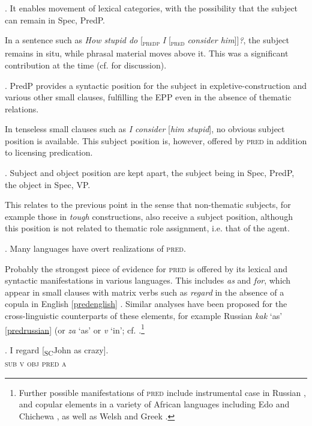 \ex. It enables movement of lexical categories, with the possibility that the subject can remain in Spec, PredP.

In a sentence such as \textit{How stupid do} [\textsubscript{\textsc{predp}} \textit{I} [\textsubscript{\textsc{pred}} \textit{consider him}]]\textit{?}, the subject remains in situ, while phrasal material moves above it. This was a significant contribution at the time (cf. \citealt[68–69]{matushansky:2019:against} for discussion).

\ex. PredP provides a syntactic position for the subject in expletive-construc\-tion and various other small clauses, fulfilling the EPP even in the absence of thematic relations.

In tenseless small clauses such as \textit{I consider} [\textit{him stupid}], no obvious subject position is available. This subject position is, however, offered by \textsc{pred} in addition to licensing predication.

\ex. Subject and object position are kept apart, the subject being in Spec, PredP, the object in Spec, VP.

This relates to the previous point in the sense that non-thematic subjects, for example those in \textit{tough} constructions, also receive a subject position, although this position is not related to thematic role assignment, i.e. that of the agent.

\ex. Many languages have overt realizations of \textsc{pred}.

Probably the strongest piece of evidence for \textsc{pred} is offered by its lexical and syntactic manifestations in various languages. This includes \textit{as} and \textit{for}, which appear in small clauses with matrix verbs such as \textit{regard} in the absence of a copula in English \ref{predenglish} \citep[596]{bowers:1993:predication}. Similar analyses have been proposed for the cross-linguistic counterparts of these elements, for example Russian \textit{kak} `as' \ref{predrussian} (or \textit{za} `as' or \textit{v} `in’; cf. \citet{bailyn:2002:overt}.\footnote{Further possible manifestations of \textsc{pred} include instrumental case in Russian \citep{bailyn:2001:syntax}, and copular elements in a variety of African languages including Edo and Chichewa \citep{baker:2003:cat}, as well as Welsh \citep{bowers:2002:pred} and Greek \citep{campos:2004:ds}.}

\exg. I regard [\textsubscript{SC}John as crazy].\\
\textsc{sub} \textsc{v} \textsc{obj} \textsc{pred} \textsc{a} \\ \null \hfill \citep[596]{bowers:1993:predication} \label{predenglish}

